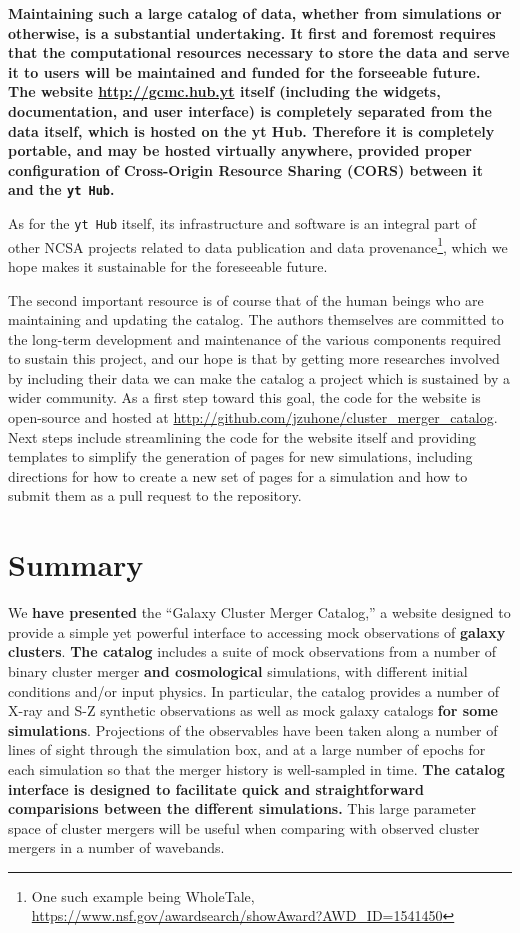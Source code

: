 \documentclass{emulateapj}
\newcommand{\code}[1]{\texttt{#1}}
\begin{document}
{\bf Maintaining such a large catalog of data, whether from simulations or otherwise, is a substantial undertaking. It first and foremost requires that the computational resources necessary to store the data and serve it to users will be maintained and funded for the forseeable future. The website \url{http://gcmc.hub.yt} itself (including the widgets, documentation, and user interface) is completely separated from the data itself, which is hosted on the yt Hub. Therefore it is completely portable, and may be hosted virtually anywhere, provided proper configuration of Cross-Origin Resource Sharing (CORS) between it and the \code{yt Hub}.

As for the \code{yt Hub} itself, its infrastructure and software is an integral part of other NCSA projects related to data publication and data provenance\footnote{One such example being WholeTale, \url{https://www.nsf.gov/awardsearch/showAward?AWD_ID=1541450}}, which we hope makes it sustainable for the foreseeable future.

The second important resource is of course that of the human beings who are maintaining and updating the catalog. The authors themselves are committed to the long-term development and maintenance of the various components required to sustain this project, and our hope is that by getting more researches involved by including their data we can make the catalog a project which is sustained by a wider community. As a first step toward this goal, the code for the website is open-source and hosted at \url{http://github.com/jzuhone/cluster_merger_catalog}. Next steps include streamlining the code for the website itself and providing templates to simplify the generation of pages for new simulations, including directions for how to create a new set of pages for a simulation and how to submit them as a pull request to the repository.} 

\section{Summary}\label{sec:summary}

We {\bf have presented} the ``Galaxy Cluster Merger Catalog,'' a website designed to provide a simple yet powerful interface to accessing mock observations of {\bf galaxy clusters}. {\bf The catalog} includes a suite of mock observations from a number of binary cluster merger {\bf and cosmological} simulations, with different initial conditions and/or input physics. In particular, the catalog provides a number of X-ray and S-Z synthetic observations as well as mock galaxy catalogs {\bf for some simulations}. Projections of the observables have been taken along a number of lines of sight through the simulation box, and at a large number of epochs for each simulation so that the merger history is well-sampled in time. {\bf The catalog interface is designed to facilitate quick and straightforward comparisions between the different simulations.} This large parameter space of cluster mergers will be useful when comparing with observed cluster mergers in a number of wavebands.
\end{document}
